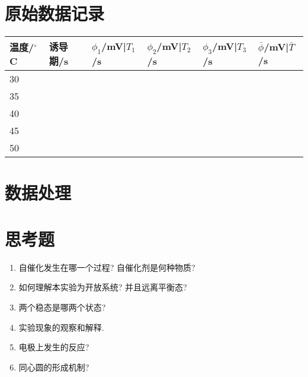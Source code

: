 \documentclass[a4paper]{article}
\begin{document}
\section{原始数据记录}
\begin{table}[H]
	\begin{center}
		\begin{tabular}{l|l|l|l|l|l}
			\hline
			温度/$^\circ$C&  诱导期/s&  $\phi_1$/mV|$T_{1}$/s & $\phi_2$/mV|$T_{2}$/s & $\phi_3$/mV|$T_{3}$/s & $\bar{\phi}$/mV|$\bar{T}$/s\\
			\hline
			30&  &  &  &  &  \\
			\hline
			35&  &  &  &  &  \\
			\hline
			40&  &  &  &  &  \\
			\hline
			45&  &  &  &  &  \\
			\hline
			50&  &  &  &  &  \\
			\hline
		 \end{tabular}
	\end{center}
\end{table}
\section{数据处理}

\section{思考题}
\begin{enumerate}
	\item 自催化发生在哪一个过程? 自催化剂是何种物质?
	\item 如何理解本实验为开放系统? 并且远离平衡态?
	\item 两个稳态是哪两个状态?
	\item 实验现象的观察和解释.
	\item 电极上发生的反应?
	\item 同心圆的形成机制?
\end{enumerate}


\end{document}
